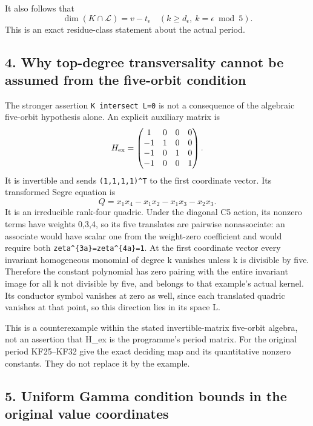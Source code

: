 \documentclass[11pt]{article}
\begin{document}
It also follows that \[
\dim(K\cap\mathcal L)=v-t_\epsilon
\quad(k\ge d_\epsilon,\ k=\epsilon\bmod5).
\tag{KF32}
\] This is an exact residue-class statement about the actual period.

\subsection{4. Why top-degree transversality cannot be assumed from the five-orbit condition}\label{why-top-degree-transversality-cannot-be-assumed-from-the-five-orbit-condition}

The stronger assertion \texttt{K\ intersect\ L=0} is not a consequence of the algebraic five-orbit hypothesis alone. An explicit auxiliary matrix is \[
H_{\rm ex}=\begin{pmatrix}
1&0&0&0\\-1&1&0&0\\-1&0&1&0\\-1&0&0&1
\end{pmatrix}.
\] It is invertible and sends \texttt{(1,1,1,1)\^{}T} to the first coordinate vector. Its transformed Segre equation is \[
Q=x_1x_4-x_1x_2-x_1x_3-x_2x_3.
\] It is an irreducible rank-four quadric. Under the diagonal C5 action, its nonzero terms have weights 0,3,4, so its five translates are pairwise nonassociate: an associate would have scalar one from the weight-zero coefficient and would require both \nolinkurl{zeta^{3a}=zeta^{4a}=1}. At the first coordinate vector every invariant homogeneous monomial of degree k vanishes unless k is divisible by five. Therefore the constant polynomial has zero pairing with the entire invariant image for all k not divisible by five, and belongs to that example's actual kernel. Its conductor symbol vanishes at zero as well, since each translated quadric vanishes at that point, so this direction lies in its space L.

This is a counterexample within the stated invertible-matrix five-orbit algebra, not an assertion that H\_ex is the programme's period matrix. For the original period KF25--KF32 give the exact deciding map and its quantitative nonzero constants. They do not replace it by the example.

\subsection{5. Uniform Gamma condition bounds in the original value coordinates}\label{uniform-gamma-condition-bounds-in-the-original-value-coordinates}
\end{document}
